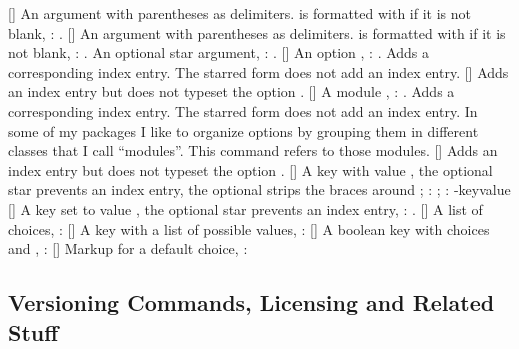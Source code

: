 \documentclass[load-preamble+,babel-options={ngerman,english}]{cnltx-doc}
\begin{document}
\begin{commands}
  []
    An argument with parentheses as delimiters.  is formatted with
     if it is not blank, : .
  []
    An argument with parentheses as delimiters. 
    is formatted with  if it is not blank, :
    .
    An optional star argument, : \sarg.
  [\sarg{}]
    An option , : .  Adds a
    corresponding index entry.  The starred form does not add an index entry.
  []
    Adds an index entry but does not typeset the option .
  [\sarg{}]
    A module , : .  Adds a
    corresponding index entry.  The starred form does not add an index entry.
    In some of my packages I like to organize options by grouping them in
    different classes that I call ``modules''.  This command refers to those
    modules.
  [\sarg{}]
    Adds an index entry but does not typeset the option .
  [\sarg\code{-}]
    A key  with value , the optional star prevents an
    index entry, the  optional \code{-} strips the braces around ;
    : ;
    \code{-}: \key-{key}{value}
  [\sarg{}]
    A key  set to value , the
    optional star prevents an index entry, :
    .
  []
    A list of choices, :
  []
    A key  with a list of possible values,
    :
  []
    A boolean key  with choices  and ,
    : 
  []
    Markup for a default choice,
    :
\end{commands}


\subsection{Versioning Commands, Licensing and Related  Stuff}\label{sec:cmds:versioning}
\end{document}
